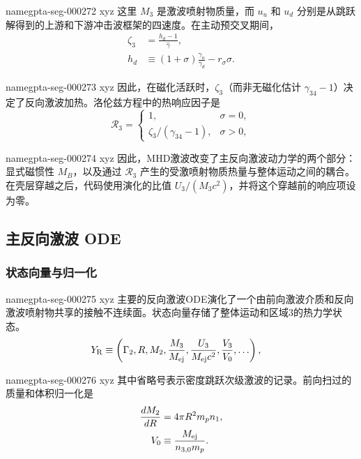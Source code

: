 \documentclass[twocolumn]{aastex702}
\makeatletter
\providecommand{\gptareaderanchor}[1]{\pdfdest name{#1} xyz}%
\providecommand{\gptareaderanchor}[1]{\special{pdf:dest (#1) [ @thispage /XYZ @xpos @ypos null ]}}%
\makeatother
\begin{document}
\gptareaderanchor{gpta-seg-000272}%
这里 \(M_3\) 是激波喷射物质量，而 \(u_u\) 和 \(u_d\) 分别是从跳跃解得到的上游和下游冲击波框架的四速度。在主动预交叉期间，
\begin{equation}
\begin{aligned}
\zeta_3&=\frac{h_d-1}{\hat{\gamma}},\\
h_d&\equiv (1+\sigma)\frac{\gamma_u}{\gamma_d}-r_\sigma\sigma .
\end{aligned}
\end{equation}

\gptareaderanchor{gpta-seg-000273}%
因此，在磁化活跃时，\(\zeta_3\)（而非无磁化估计 \(\gamma_{34}-1\)）决定了反向激波加热。洛伦兹方程中的热响应因子是
\begin{equation}
\mathcal R_3=
\begin{cases}
1, & \sigma=0,\\
\zeta_3/(\gamma_{34}-1), & \sigma>0,
\end{cases}
\end{equation}

\gptareaderanchor{gpta-seg-000274}%
因此，MHD激波改变了主反向激波动力学的两个部分：显式磁惯性 \(M_B\)，以及通过 \(\mathcal R_3\) 产生的受激喷射物质热量与整体运动之间的耦合。在壳层穿越之后，代码使用演化的比值 \(U_3/(M_3c^2)\)，并将这个穿越前的响应项设为零。

\subsection{主反向激波 ODE}

\subsubsection{状态向量与归一化}


\gptareaderanchor{gpta-seg-000275}%
主要的反向激波ODE演化了一个由前向激波介质和反向激波喷射物共享的接触不连续面。状态向量存储了整体运动和区域3的热力学状态。
\begin{equation}
\begin{aligned}
Y_{\rm R}&\equiv
\left(\Gamma_2,R,M_2,\frac{M_3}{M_{\rm ej}},
\frac{U_3}{M_{\rm ej}c^2},\frac{V_3}{V_0},\ldots\right),
\end{aligned}
\end{equation}

\gptareaderanchor{gpta-seg-000276}%
其中省略号表示密度跳跃次级激波的记录。前向扫过的质量和体积归一化是
\begin{equation}
\begin{aligned}
\frac{dM_2}{dR}&=4\pi R^2m_pn_1,\\
V_0&\equiv \frac{M_{\rm ej}}{n_{3,0}m_p}.
\end{aligned}
\end{equation}
\end{document}
